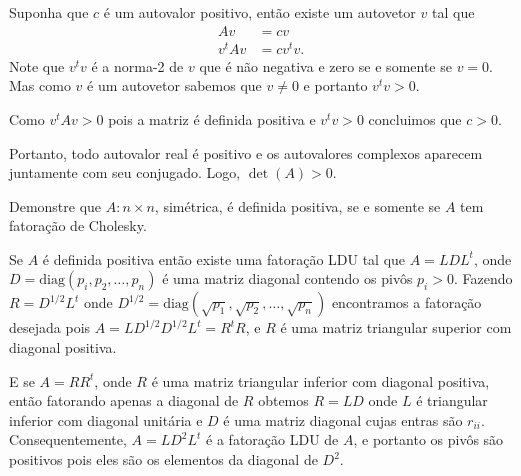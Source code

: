 \documentclass[a4paper,12pt, leqno, answers]{exam}
\begin{document}
\begin{questions}
\begin{solution}
        Suponha que $c$ \'{e} um autovalor positivo, ent\~{a}o existe um autovetor $v$ tal que
        \begin{align*}
            A v &= c v \\
            v^t A v &= c v^t v.
        \end{align*}
        Note que $v^t v$ \'{e} a norma-2 de $v$ que \'{e} n\~{a}o negativa e zero se e somente se $v = 0$. Mas como $v$ \'{e} um autovetor sabemos que $v \neq 0$ e portanto $v^t v > 0$.

        Como $v^t A v > 0$ pois a matriz \'{e} definida positiva e $v^t v > 0$ concluimos que $c > 0$.

        Portanto, todo autovalor real \'{e} positivo e os autovalores complexos aparecem juntamente com seu conjugado. Logo, $\det(A) > 0$.
    \end{solution}

     Demonstre que $A : n \times n$, sim\'{e}trica, \'{e} definida positiva, se e somente se $A$ tem fatora\c{c}\~{a}o de Cholesky.
    \begin{solution}
        Se $A$ \'{e} definida positiva ent\~{a}o existe uma fatora\c{c}\~{a}o LDU tal que $A = L D L^t$, onde $D = \text{diag}(p_i, p_2, \ldots, p_n)$ \'{e} uma matriz diagonal contendo os pivôs $p_i > 0$. Fazendo $R = D^{1/2} L^t$ onde $D^{1/2} = \text{diag}(\sqrt{p_1}, \sqrt{p_2}, \ldots, \sqrt{p_n})$ encontramos a fatora\c{c}\~{a}o desejada pois $A = L D^{1/2} D^{1/2} L^t = R^t R$, e $R$ \'{e} uma matriz triangular superior com diagonal positiva.
        
        E se $A = R R^t$, onde $R$ \'{e} uma matriz triangular inferior com diagonal positiva, ent\~{a}o fatorando apenas a diagonal de $R$ obtemos $R = L D$ onde $L$ \'{e} triangular inferior com diagonal unit\'{a}ria e $D$ \'{e} uma matriz diagonal cujas entras s\~{a}o $r_{ii}$. Consequentemente, $A = L D^2 L^t$ \'{e} a fatora\c{c}\~{a}o LDU de $A$, e portanto os pivôs s\~{a}o positivos pois eles s\~{a}o os elementos da diagonal de $D^2$.
    \end{solution}


\end{questions}
\end{document}
